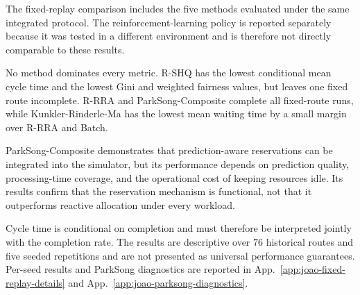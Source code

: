 The fixed-replay comparison includes the five methods evaluated under the same
integrated protocol. The reinforcement-learning policy is reported separately
because it was tested in a different environment and is therefore not directly
comparable to these results.

\begin{table}[H]
    \caption{Canonical fixed-replay allocation comparison over five seeds.}
    \label{tab:cross_method_fixed_replay_joao}
    \centering
    \renewcommand{\arraystretch}{1.0}
    \scriptsize
\end{table}

No method dominates every metric. R-SHQ has the lowest conditional mean cycle
time and the lowest Gini and weighted fairness values, but leaves one fixed
route incomplete. R-RRA and ParkSong-Composite complete all fixed-route runs,
while Kunkler-Rinderle-Ma has the lowest mean waiting time by a small margin
over R-RRA and Batch.

ParkSong-Composite demonstrates that prediction-aware reservations can be
integrated into the simulator, but its performance depends on prediction
quality, processing-time coverage, and the operational cost of keeping
resources idle. Its results confirm that the reservation mechanism is
functional, not that it outperforms reactive allocation under every workload.

Cycle time is conditional on completion and must therefore be interpreted
jointly with the completion rate. The results are descriptive over $76$
historical routes and five seeded repetitions and are not presented as
universal performance guarantees. Per-seed results and ParkSong diagnostics
are reported in App.~\ref{app:joao-fixed-replay-details} and
App.~\ref{app:joao-parksong-diagnostics}.